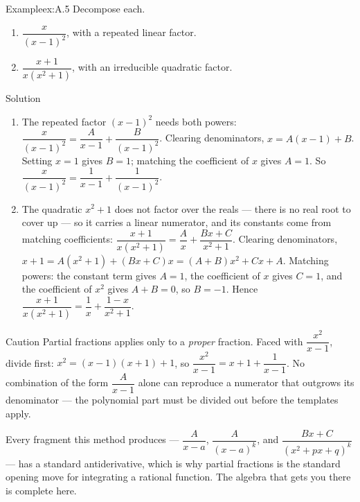 \documentclass[a4paper,12pt,oneside]{memoir}
\begin{document}
\begin{workedexample}
\begin{envexample}{Example}{ex:A.5}{}
Decompose each.

\begin{enumerate}
  \item \(\dfrac{x}{(x - 1)^{2}}\), with a repeated linear factor.
  \item \(\dfrac{x + 1}{x(x^{2} + 1)}\), with an irreducible quadratic factor.
\end{enumerate}
\end{envexample}
\begin{envsolution}{Solution}{}{}
\begin{enumerate}
  \item The repeated factor \((x - 1)^{2}\) needs both powers: \(\dfrac{x}{(x - 1)^{2}} = \dfrac{A}{x - 1} + \dfrac{B}{(x - 1)^{2}}\). Clearing denominators, \(x = A(x - 1) + B\). Setting \(x = 1\) gives \(B = 1\); matching the coefficient of \(x\) gives \(A = 1\). So \(\dfrac{x}{(x - 1)^{2}} = \dfrac{1}{x - 1} + \dfrac{1}{(x - 1)^{2}}\).
  \item The quadratic \(x^{2} + 1\) does not factor over the reals — there is no real root to cover up — so it carries a linear numerator, and its constants come from matching coefficients: \(\dfrac{x + 1}{x(x^{2} + 1)} = \dfrac{A}{x} + \dfrac{Bx + C}{x^{2} + 1}\). Clearing denominators, \(x + 1 = A(x^{2} + 1) + (Bx + C)x = (A + B)x^{2} + Cx + A\). Matching powers: the constant term gives \(A = 1\), the coefficient of \(x\) gives \(C = 1\), and the coefficient of \(x^{2}\) gives \(A + B = 0\), so \(B = -1\). Hence \(\dfrac{x + 1}{x(x^{2} + 1)} = \dfrac{1}{x} + \dfrac{1 - x}{x^{2} + 1}\).
\end{enumerate}
\end{envsolution}
\end{workedexample}
\begin{envcaution}{Caution}{}{}
Partial fractions applies only to a \emph{proper} fraction. Faced with \(\dfrac{x^{2}}{x - 1}\), divide first: \(x^{2} = (x - 1)(x + 1) + 1\), so \(\dfrac{x^{2}}{x - 1} = x + 1 + \dfrac{1}{x - 1}\). No combination of the form \(\dfrac{A}{x - 1}\) alone can reproduce a numerator that outgrows its denominator — the polynomial part must be divided out before the templates apply.
\end{envcaution}
Every fragment this method produces — \(\dfrac{A}{x - a}\), \(\dfrac{A}{(x - a)^{k}}\), and \(\dfrac{Bx + C}{(x^{2} + px + q)^{k}}\) — has a standard antiderivative, which is why partial fractions is the standard opening move for integrating a rational function. The algebra that gets you there is complete here.
\end{document}

